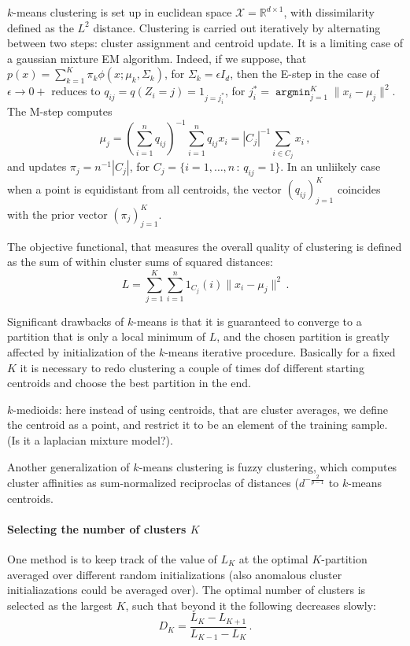 \documentclass[a4paper]{article}
\newcommand{\Xcal}{\mathcal{X}}
\newcommand{\Real}{\mathbb{R}}
\newcommand{\argmin}{\mathop{\mathtt{argmin}}\nolimits}
\begin{document}
$k$-means clustering is set up in euclidean space $\Xcal = \Real^{d\times1}$, with
dissimilarity defined as the $L^2$ distance. Clustering is carried out iteratively
by alternating between two steps: cluster assignment and centroid update. It is a
limiting case of a gaussian mixture EM algorithm. Indeed, if we suppose, that
$p(x) = \sum_{k=1}^K \pi_k\phi(x;\mu_k, \Sigma_k)$, for $\Sigma_k = \epsilon I_d$,
then the E-step in the case of $\epsilon\to 0+$ reduces to $q_{ij} = q(Z_i=j)
= 1_{j=j_i^*}$, for $j_i^* = \argmin_{j=1}^K \|x_i - \mu_j\|^2$. The M-step
computes
$$ \mu_j
    = (\sum_{i=1}^n q_{ij})^{-1} \sum_{i=1}^n q_{ij} x_i
    = |C_j|^{-1} \sum_{i\in C_j} x_i
    \,, $$
and updates $\pi_j = n^{-1} |C_j|$, for $C_j = \{i=1,\ldots, n\,:\, q_{ij}=1\}$.
In an unliikely case when a point is equidistant from all centroids, the vector
$(q_{ij})_{j=1}^K$ coincides with the prior vector $(\pi_j)_{j=1}^K$.

The objective functional, that measures the overall quality of clustering is defined
as the sum of within cluster sums of squared distances:
$$ L = \sum_{j=1}^K \sum_{i=1}^n 1_{C_j}(i) \|x_i - \mu_j \|^2 \,. $$

Significant drawbacks of $k$-means is that it is guaranteed to converge to a partition
that is only a local minimum of $L$, and the chosen partition is greatly affected
by initialization of the $k$-means iterative procedure. Basically for a fixed $K$
it is necessary to redo clustering a couple of times dof different starting centroids
and choose the best partition in the end.

$k$-medioids: here instead of using centroids, that are cluster averages, we define
the centroid as a point, and restrict it to be an element of the training sample.
(Is it a laplacian mixture model?).

Another generalization of $k$-means clustering is fuzzy clustering, which computes
cluster affinities as sum-normalized reciproclas of distances ($d^{-\frac{2}{p-1}}$
to $k$-means centroids.

\paragraph{Selecting the number of clusters $K$} %
\label{par:selecting_the_number_of_clusters_k}

One method is to keep track of the value of $L_K$ at the optimal $K$-partition averaged
over different random initializations (also anomalous cluster initialiazations could
be averaged over). The optimal number of clusters is selected as the largest $K$,
such that beyond it the following decreases slowly:
$$ D_K = \frac{L_K-L_{K+1}}{L_{K-1}-L_K} \,. $$
\end{document}
